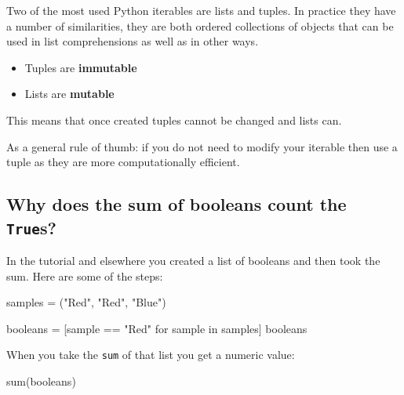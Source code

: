Two of the most used Python iterables are lists and tuples. In practice they
have a number of similarities, they are both ordered collections of objects that
can be used in list comprehensions as well as in other ways.
\begin{itemize}
\item 

Tuples are \textbf{immutable}

\item 

Lists are \textbf{mutable}

\end{itemize}


This means that once created tuples cannot be changed and lists can.


As a general rule of thumb: if you do not need to modify your iterable then use
a tuple as they are more computationally efficient.



\subsection{Why does the sum of booleans count the \texttt{True}s?}
\label{\detokenize{tools-for-mathematics/06-probability/why/main:why-does-the-sum-of-booleans-counts-the-trues}}

In the tutorial and elsewhere you created a list of booleans and then took the
sum. Here are some of the steps:




\begin{pyin}
samples = ("Red", "Red", "Blue")
\end{pyin}







\begin{pyin}
booleans = [sample == "Red" for sample in samples]
booleans
\end{pyin}





\begin{raw}
\end{raw}





When you take the \texttt{sum} of that list you get a numeric value:




\begin{pyin}
sum(booleans)
\end{pyin}





